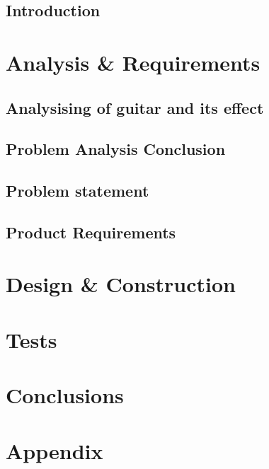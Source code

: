 \glsresetall
 \graphicspath{{figures/analysing/}}
\chapter{Introduction}

\part{Analysis \& Requirements}\label{pt:analysis} \glsresetall
 \graphicspath{{figures/analysing/}}
 \chapter{Analysising of guitar and its effect}\label{ch:analysing}
 
 

\label{sec:platform_comparing}
 \label{sec:FPGA}
 \label{sec:digital_vs_analog}
\chapter{Problem Analysis Conclusion}

\chapter{Problem statement}

\chapter{Product Requirements}







\part{Design \& Construction}\label{pt:design} 
 
\part{Tests}\label{pt:tests} 
\part{Conclusions}\label{pt:conclusions} 
%

\glsresetall
 \graphicspath{{figures/appendix/}}
\part{Appendix}\label{pt:appendix}


